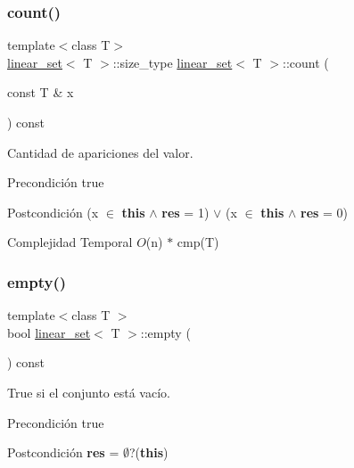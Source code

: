 \subsubsection{\texorpdfstring{count()}{count()}}
{\footnotesize\ttfamily template$<$class T$>$ \\
\mbox{\hyperlink{classlinear__set}{linear\+\_\+set}}$<$ T $>$\+::size\+\_\+type \mbox{\hyperlink{classlinear__set}{linear\+\_\+set}}$<$ T $>$\+::count (\begin{DoxyParamCaption}\item[{const T \&}]{x }\end{DoxyParamCaption}) const}



Cantidad de apariciones del valor. 

\begin{DoxyPrecond}{Precondición}
true 
\end{DoxyPrecond}
\begin{DoxyPostcond}{Postcondición}
(x $\in$ {\bfseries this} $\land$ {\bfseries res} = 1) $\lor$ (x  $\in$ {\bfseries this} $\land$ {\bfseries res} = 0)
\end{DoxyPostcond}

\begin{DoxyDescription}
\item[Complejidad Temporal]$O$(n) $\ast$ cmp(\+T)
\end{DoxyDescription}\mbox{\label{classlinear__set_a3f78f76d16b8570efa01319dad8d1834}} 
\subsubsection{\texorpdfstring{empty()}{empty()}}
{\footnotesize\ttfamily template$<$class T $>$ \\
bool \mbox{\hyperlink{classlinear__set}{linear\+\_\+set}}$<$ T $>$\+::empty (\begin{DoxyParamCaption}{ }\end{DoxyParamCaption}) const}



True si el conjunto está vacío. 

\begin{DoxyPrecond}{Precondición}
true 
\end{DoxyPrecond}
\begin{DoxyPostcond}{Postcondición}
{\bfseries res} = $\emptyset$?({\bfseries this})
\end{DoxyPostcond}

